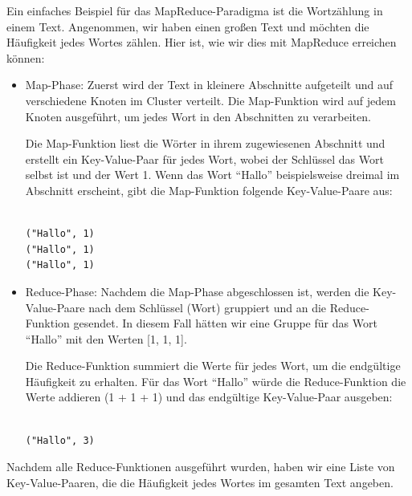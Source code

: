 \documentclass[../vs-script-first-v01.tex]{subfiles}
\begin{document}
Ein einfaches Beispiel für das MapReduce-Paradigma ist die Wortzählung in einem Text. Angenommen, wir haben einen großen Text und möchten die Häufigkeit jedes Wortes zählen. Hier ist, wie wir dies mit MapReduce erreichen können:
\begin{itemize} 
\item Map-Phase: Zuerst wird der Text in kleinere Abschnitte aufgeteilt und auf verschiedene Knoten im Cluster verteilt. Die Map-Funktion wird auf jedem Knoten ausgeführt, um jedes Wort in den Abschnitten zu verarbeiten.

Die Map-Funktion liest die Wörter in ihrem zugewiesenen Abschnitt und erstellt ein Key-Value-Paar für jedes Wort, wobei der Schlüssel das Wort selbst ist und der Wert 1. Wenn das Wort \enquote{Hallo} beispielsweise dreimal im Abschnitt erscheint, gibt die Map-Funktion folgende Key-Value-Paare aus:\\\\

\noindent\begin{minipage}{\textwidth}
\begin{lstlisting}[caption={Ausgabe},captionpos=b,label={lst:mapI}]
("Hallo", 1)
("Hallo", 1)
("Hallo", 1)
\end{lstlisting}
\end{minipage}

\item Reduce-Phase: Nachdem die Map-Phase abgeschlossen ist, werden die Key-Value-Paare nach dem Schlüssel (Wort) gruppiert und an die Reduce-Funktion gesendet. In diesem Fall hätten wir eine Gruppe für das Wort \enquote{Hallo} mit den Werten [1, 1, 1].

Die Reduce-Funktion summiert die Werte für jedes Wort, um die endgültige Häufigkeit zu erhalten. Für das Wort \enquote{Hallo} würde die Reduce-Funktion die Werte addieren (1 + 1 + 1) und das endgültige Key-Value-Paar ausgeben: \\\\

\noindent\begin{minipage}{\textwidth}
\begin{lstlisting}[caption={Ausgabe},captionpos=b,label={lst:mapII}]
("Hallo", 3)
\end{lstlisting}
\end{minipage}
\end{itemize}  

Nachdem alle Reduce-Funktionen ausgeführt wurden, haben wir eine Liste von Key-Value-Paaren, die die Häufigkeit jedes Wortes im gesamten Text angeben.
\end{document}

